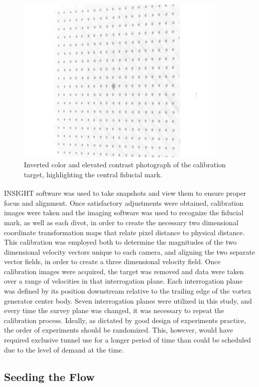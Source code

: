 \begin{figure}[H]
	\centering
	\includegraphics[width=4in]{figs/piv_method/calibration_target}
	\caption{Inverted color and elevated contrast photograph of the calibration 
		target, highlighting the central fiducial mark.}
	\label{fig:calibration_target}
\end{figure}


INSIGHT\textsuperscript{\textcopyright} software was used to take snapshots and 
view them to ensure proper focus 
and alignment. Once satisfactory adjustments were obtained, calibration images 
were taken and the imaging software was used to recognize the fiducial mark, as 
well as each divot, in order to create the necessary two dimensional coordinate 
transformation maps that relate
pixel distance to physical distance. This calibration was employed both to 
determine the magnitudes of the two dimensional velocity vectors unique to each 
camera, and aligning the two separate vector fields, in order to create a three 
dimensional velocity field. Once calibration images were acquired, the 
target was removed and data were taken over a range of velocities in 
that interrogation plane. Each interrogation plane was defined by its position 
downstream relative to the trailing edge of the vortex generator center body. 
Seven interrogation planes were utilized in this study, and every time the 
survey plane was changed, it was necessary to repeat the calibration process. 
Ideally, as dictated by good design of experiments 
practice, the order of experiments should be randomized. This, however, would 
have required exclusive tunnel use for a longer period of time than could be 
scheduled due to the level of demand at the time.

\subsection{Seeding the Flow}

